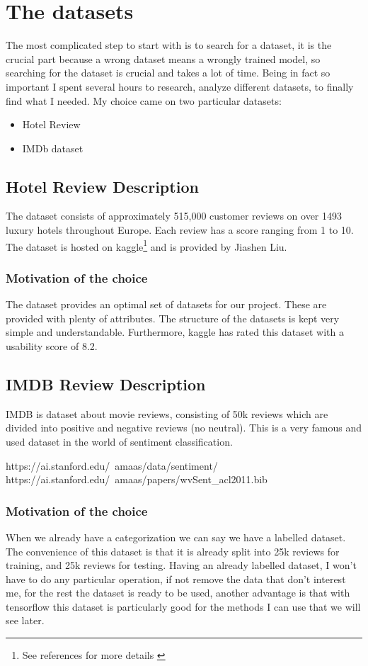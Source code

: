 \section{The \gls{dataset}s}
The most complicated step to start with is to search for a dataset, it is the crucial part because a wrong dataset means a wrongly trained model, so searching for the dataset is crucial and takes a lot of time.
Being in fact so important I spent several hours to research, analyze different datasets, to finally find what I needed.
My choice came on two particular datasets:
\begin{itemize}
    \item Hotel Review
    \item IMDb dataset
\end{itemize}

\subsection{Hotel Review Description}
The dataset consists of approximately 515,000 customer reviews on over 1493 luxury hotels throughout Europe. Each review has a score ranging from 1 to 10. The dataset is hosted on \gls{kaggle}\footnote{See references for more details \cite{515k_kaggle}} and is provided by Jiashen Liu.


\subsubsection*{Motivation of the choice}

The \gls{dataset} provides an optimal set of datasets for our project. These are provided with plenty of attributes. The structure of the datasets is kept very simple and understandable. Furthermore, \gls{kaggle} has rated this \gls{dataset} with a usability score of 8.2.

\subsection{IMDB Review Description}
IMDB is dataset about movie reviews, consisting of 50k reviews which are divided into positive and negative reviews (no neutral).
This is a very famous and used dataset in the world of sentiment classification. 

https://ai.stanford.edu/~amaas/data/sentiment/
https://ai.stanford.edu/~amaas/papers/wvSent_acl2011.bib

\subsubsection*{Motivation of the choice}
When we already have a categorization we can say we have a labelled dataset.
The convenience of this dataset is that it is already split into 25k reviews for training, and 25k reviews for testing.
Having an already labelled dataset, I won't have to do any particular operation, if not remove the data that don't interest me, for the rest the dataset is ready to be used, another advantage is that with tensorflow this dataset is particularly good for the methods I can use that we will see later.

